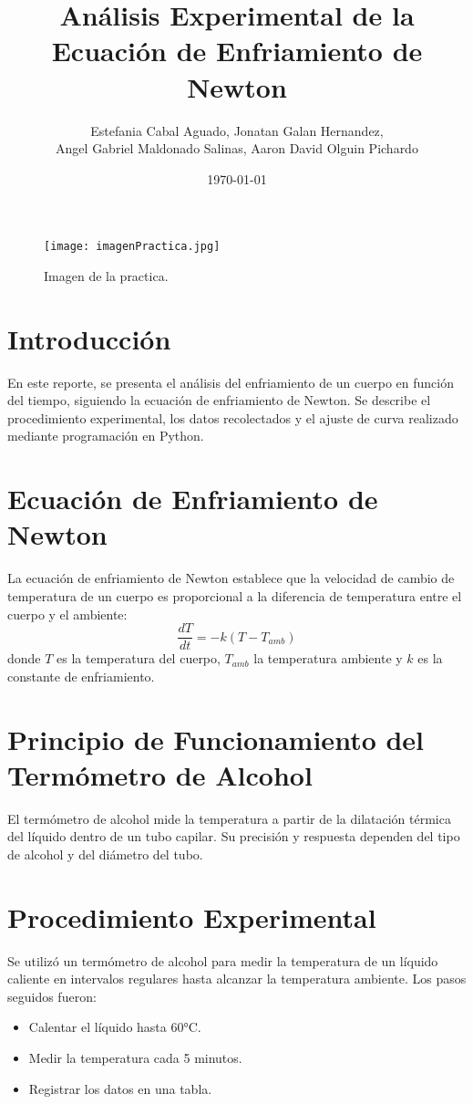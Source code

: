 \documentclass[a4paper,12pt]{article}
\title{\textbf{Análisis Experimental de la Ecuación de Enfriamiento de Newton}}
\author{Estefania Cabal Aguado, Jonatan Galan Hernandez, \\
Angel Gabriel Maldonado Salinas, Aaron David Olguin Pichardo}
\date{\today}
\begin{document}
\maketitle

\begin{figure}[H]
    \centering
    \texttt{[image: imagenPractica.jpg]}
    \caption{Imagen de la practica.}
\end{figure}

\newpage
\tableofcontents
\newpage

\section{Introducción}
En este reporte, se presenta el análisis del enfriamiento de un cuerpo en función del tiempo, siguiendo la ecuación de enfriamiento de Newton. Se describe el procedimiento experimental, los datos recolectados y el ajuste de curva realizado mediante programación en Python.

\section{Ecuación de Enfriamiento de Newton}
La ecuación de enfriamiento de Newton establece que la velocidad de cambio de temperatura de un cuerpo es proporcional a la diferencia de temperatura entre el cuerpo y el ambiente:
\begin{equation}
    \frac{dT}{dt} = -k (T - T_{amb})
\end{equation}
donde $T$ es la temperatura del cuerpo, $T_{amb}$ la temperatura ambiente y $k$ es la constante de enfriamiento.

\section{Principio de Funcionamiento del Termómetro de Alcohol}
El termómetro de alcohol mide la temperatura a partir de la dilatación térmica del líquido dentro de un tubo capilar. Su precisión y respuesta dependen del tipo de alcohol y del diámetro del tubo.

\section{Procedimiento Experimental}
Se utilizó un termómetro de alcohol para medir la temperatura de un líquido caliente en intervalos regulares hasta alcanzar la temperatura ambiente. Los pasos seguidos fueron:
\begin{itemize}
    \item Calentar el líquido hasta 60°C.
    \item Medir la temperatura cada 5 minutos.
    \item Registrar los datos en una tabla.
\end{itemize}
\end{document}
